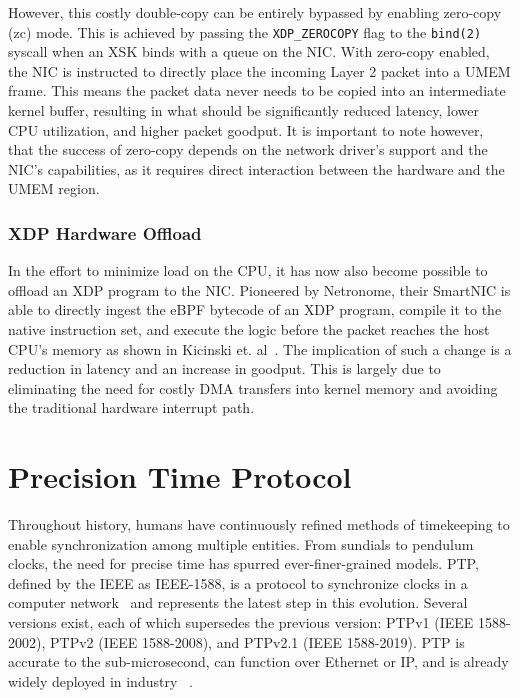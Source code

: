However, this costly double-copy can be entirely bypassed by enabling zero-copy (zc) mode. This is achieved by passing the \texttt{XDP\_ZEROCOPY} flag to the \texttt{bind(2)} syscall when an \ac{XSK} binds with a queue on the NIC. With zero-copy enabled, the \ac{NIC} is instructed to directly place the incoming Layer 2 packet into a UMEM frame. This means the packet data never needs to be copied into an intermediate kernel buffer, resulting in what should be significantly reduced latency, lower CPU utilization, and higher packet goodput. It is important to note however, that the success of zero-copy depends on the network driver's support and the NIC's capabilities, as it requires direct interaction between the hardware and the UMEM region.

\subsubsection{XDP Hardware Offload}
\label{subsec:xdp-hardware-offload}
In the effort to minimize load on the CPU, it has now also become possible to offload an XDP program to the \ac{NIC}. Pioneered by Netronome, their SmartNIC is able to directly ingest the \ac{eBPF} bytecode of an \ac{XDP} program, compile it to the native instruction set, and execute the logic before the packet reaches the host CPU's memory as shown in Kicinski et. al~\cite{Kicinski2017XDP}. The implication of such a change is a reduction in latency and an increase in goodput. This is largely due to eliminating the need for costly \ac{DMA} transfers into kernel memory and avoiding the traditional hardware interrupt path.

\section{Precision Time Protocol}
\label{sec:ptp}
Throughout history, humans have continuously refined methods of timekeeping to enable synchronization among multiple entities. From sundials to pendulum clocks, the need for precise time has spurred ever-finer-grained models. \ac{PTP}, defined by the \ac{IEEE} as \ac{IEEE}-1588, is a protocol to synchronize clocks in a computer network~\cite{IEEE1588_2019_PTP} and represents the latest step in this evolution. Several versions exist, each of which supersedes the previous version: PTPv1 (\ac{IEEE} 1588-2002), PTPv2 (\ac{IEEE} 1588-2008), and PTPv2.1 (\ac{IEEE} 1588-2019). \ac{PTP} is accurate to the sub-microsecond, can function over Ethernet or IP, and is already widely deployed in industry ~\cite{MetaPTP2022}.

